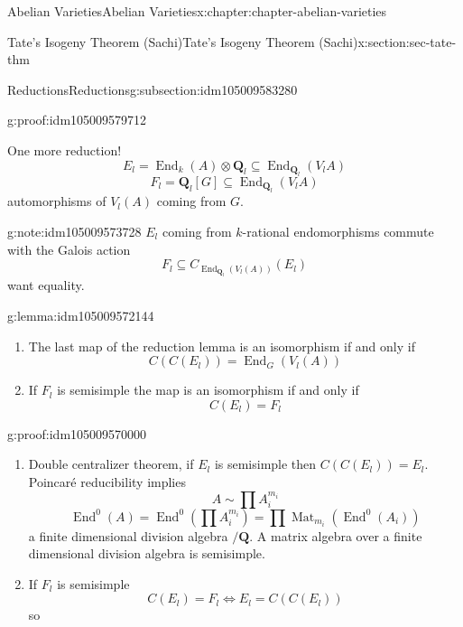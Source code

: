 \documentclass[oneside,10pt,]{book}
\numberwithin{equation}{section}
\newcommand{\QQ}{\mathbf{Q}}
\DeclareMathOperator{\End}{End}
\DeclareMathOperator{\Mat}{Mat}
\begin{document}
\begin{chapterptx}{Abelian Varieties}{}{Abelian Varieties}{}{}{x:chapter:chapter-abelian-varieties}
\begin{sectionptx}{Tate's Isogeny Theorem (Sachi)}{}{Tate's Isogeny Theorem (Sachi)}{}{}{x:section:sec-tate-thm}
\begin{subsectionptx}{Reductions}{}{Reductions}{}{}{g:subsection:idm105009583280}
\begin{proofptx}{}{g:proof:idm105009579712}
%
\end{proofptx}
One more reduction!%
\begin{equation*}
E_l = \End_k(A) \otimes \QQ_l\subseteq \End_{\QQ_l} (V_lA)
\end{equation*}
%
\begin{equation*}
F_l = \QQ_l[G] \subseteq \End_{\QQ_l} (V_lA)
\end{equation*}
automorphisms of \(V_l(A) \) coming from \(G\).%
\begin{note}{}{g:note:idm105009573728}%
\(E_l\) coming from \(k\)-rational endomorphisms commute with the Galois action%
\begin{equation*}
F_l\subseteq C_{\End_{\QQ_l}(V_l(A))}(E_l)
\end{equation*}
want equality.%
\end{note}
\begin{lemma}{}{}{g:lemma:idm105009572144}%
%
\begin{enumerate}
\item{}The last map of the reduction lemma is an isomorphism if and only if%
\begin{equation*}
C(C(E_l)) = \End_G(V_l(A))
\end{equation*}
%
\item{}If \(F_l\) is semisimple the map is an isomorphism if and only if%
\begin{equation*}
C(E_l) = F_l
\end{equation*}
%
\end{enumerate}
%
\end{lemma}
\begin{proofptx}{}{g:proof:idm105009570000}
%
\begin{enumerate}
\item{}Double centralizer theorem, if \(E_l\) is semisimple then \(C(C(E_l))= E_l\). Poincaré reducibility implies%
\begin{equation*}
A\sim \prod A_i^{m_i}
\end{equation*}
%
\begin{equation*}
\End^0(A) = \End^0(\prod A_i^{m_i}) = \prod \Mat_{m_i}(\End^0(A_i))
\end{equation*}
a finite dimensional division algebra \(/\QQ\). A matrix algebra over a finite dimensional division algebra is semisimple.%
\item{}If \(F_l\) is semisimple%
\begin{equation*}
C(E_l) = F_l \iff E_l = C(C(E_l))
\end{equation*}
so%
\begin{equation*}

\end{equation*}
\end{enumerate}
\end{proofptx}
\end{subsectionptx}
\end{sectionptx}
\end{chapterptx}
\end{document}
